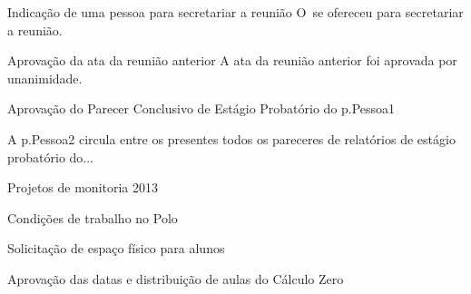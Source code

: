 \documentclass[12pt,a4paper]{ata}
\begin{document}
\begin{ponto}{Indicação de uma pessoa para secretariar a reunião}
  O~\prof \secretariou \space se ofereceu para secretariar a reunião.
\end{ponto}

\begin{ponto}{Aprovação da ata da reunião anterior}
  A ata da reunião anterior foi aprovada por unanimidade.
\end{ponto}

\begin{ponto}{Aprovação do Parecer Conclusivo de Estágio Probatório do
  \prof \gls{p.Pessoa1}
}

 A \profa \gls{p.Pessoa2} circula entre os presentes
todos os pareceres de relatórios de estágio probatório do...

\end{ponto}



\begin{ponto}{Projetos de monitoria 2013}

\dummyText

\end{ponto}

\begin{ponto}{Condições de trabalho no Polo}
	\dummyText
\end{ponto}

\begin{ponto}{Solicitação de espaço físico para alunos}
	\dummyText
\end{ponto}



\begin{ponto}{Aprovação das datas e distribuição de aulas do Cálculo Zero}
	\dummyText
\end{ponto}
\end{document}
